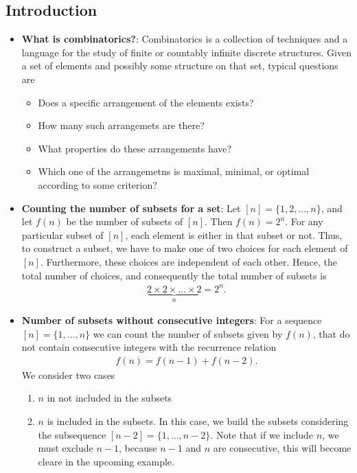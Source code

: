 \documentclass{report}
\begin{document}
    \subsection{Introduction}
    \begin{itemize}
        \item \textbf{What is combinatorics?}: Combinatorics is a collection of techniques and a language for the study of finite or countably infinite discrete structures. Given a set of elements and possibly some structure on that set, typical questions are
            \begin{itemize}
                \item Does a specific arrangement of the elements exists?
                \item How many such arrangemets are there?
                \item What properties do these arrangements have?
                \item Which one of the arrangemetns is maximal, minimal, or optimal according to some criterion?
            \end{itemize}
        \item \textbf{Counting the number of subsets for a set}: Let $[n] = \{1,2,...,n\} $, and let $f(n)$ be the number of subsets of $[n]$. Then $f(n) = 2^{n}$. For any particular subset of $[n]$, each element is either in that subset or not. Thus, to construct a subset, we have to make one of two choices for each element of $[n]$. Furthermore, these choices are independent of each other. Hence, the total number of choices, and consequently the total number of subsets is 
            \begin{align*}
                \underbrace{2\times2\times...\times2}_{n} = 2^{n}
            .\end{align*}
        \item \textbf{Number of subsets without consecutive integers}: For a sequence $[n] = \{1,...,n\}$ we can count the number of subsets given by $f(n)$, that do not contain consecutive integers with the recurrence relation
            \begin{align*}
                f(n) = f(n-1) + f(n-2)
            .\end{align*}
            We consider two cases
            \begin{enumerate}
                \item $n$ in not included in the subsets
                \item $n$ is included in the subsets. In this case, we build the subsets considering the subsequence $[n-2]  = \{1,...,n-2\}$. Note that if we include $n$, we must exclude $n-1$, because $n-1$ and $n$ are consecutive, this will become cleare in the upcoming example.

\end{enumerate}
\end{itemize}
\end{document}

